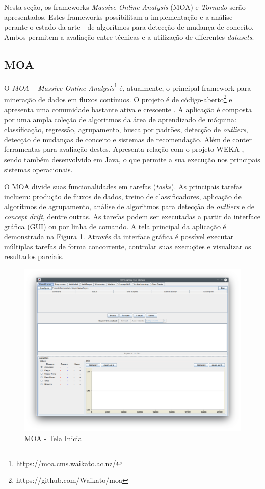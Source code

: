 \documentclass[qual, classic, a4paper]{ufbathesis}
\begin{document}
Nesta seção, os frameworks \textit{Massive Online Analysis} (MOA) e \textit{Tornado} serão apresentados.
Estes frameworks possibilitam a implementação e a análise - perante o estado da arte - de algoritmos para detecção de mudança de conceito.
Ambos permitem a avaliação entre técnicas e a utilização de diferentes \textit{datasets}.

\subsection{MOA}

O \textit{MOA – Massive Online Analysis}\footnote{https://moa.cms.waikato.ac.nz/} é, atualmente, o principal framework para mineração de dados em fluxos contínuos.
O projeto é de código-aberto\footnote{https://github.com/Waikato/moa} e apresenta uma comunidade bastante ativa e crescente \cite{Bifet:2010:MMO:1756006.1859903}.
A aplicação é composta por uma ampla coleção de algoritmos da área de aprendizado de máquina: classificação, regressão, agrupamento, busca por padrões, detecção de \textit{outliers}, detecção de mudanças de conceito e sistemas de recomendação.
Além de conter ferramentas para avaliação destes.
Apresenta relação com o projeto WEKA \cite{Hall:2009:WDM:1656274.1656278}, sendo também desenvolvido em Java, o que permite a sua execução nos principais sistemas operacionais.

O MOA divide suas funcionalidades em tarefas (\textit{tasks}).
As principais tarefas incluem:
produção de fluxos de dados,
treino de classificadores,
aplicação de algoritmos de agrupamento,
análise de algoritmos para detecção de \textit{outliers} e de \textit{concept drift}, dentre outras.
As tarefas podem ser executadas a partir da interface gráfica (GUI) ou por linha de comando.
A tela principal da aplicação é demonstrada na Figura \ref{fig:moa}.
Através da interface gráfica é possível executar múltiplas tarefas de forma concorrente, 
controlar suas execuções e visualizar os resultados parciais.

\begin{figure}[!ht]
\begin{center}
    \includegraphics[scale=0.5]{imagens/moa.png}
    \caption{MOA - Tela Inicial}
    \label{fig:moa}
\end{center}
\end{figure}
\end{document}
